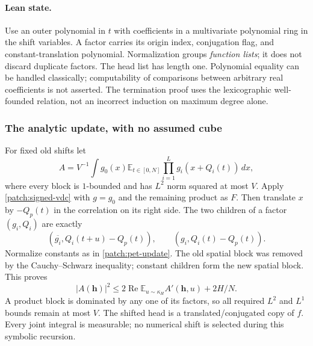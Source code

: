 \documentclass[11pt]{article}
\theoremstyle{definition}
\begin{document}
\paragraph{Lean state.}
Use an outer polynomial in $t$ with coefficients in a multivariate polynomial ring in the
shift variables.  A factor carries its origin index, conjugation flag, and constant-translation
polynomial.  Normalization groups \emph{function lists}; it does not discard duplicate factors.
The head list has length one.  Polynomial equality can be handled classically; computability
of comparisons between arbitrary real coefficients is not asserted.  The termination proof
uses the lexicographic well-founded relation, not an incorrect induction on maximum degree alone.

\subsubsection{The analytic update, with no assumed cube}
For fixed old shifts let
\[
 A=V^{-1}\int g_0(x)\mathbb E_{t\in[0,N]}
                   \prod_{i=1}^L g_i(x+Q_i(t))\,dx,
\]
where every block is $1$-bounded and has $L^2$ norm squared at most $V$.
Apply \cref{patch:signed-vdc} with $g=g_0$ and the remaining product as $F$.
Then translate $x$ by $-Q_p(t)$ in the correlation on its right side.
The two children of a factor $(g_i,Q_i)$ are exactly
\[
 (\overline{g_i},Q_i(t+u)-Q_p(t)),\qquad(g_i,Q_i(t)-Q_p(t)).
\]
Normalize constants as in \cref{patch:pet-update}.  The old spatial block was removed by the
Cauchy--Schwarz inequality; constant children form the new spatial block.  This proves
\begin{equation}\label{patch:pet-analytic-step}
 |A(\mathbf h)|^2\leq2\operatorname{Re}\mathbb E_{u\sim\kappa_H}
                       A'(\mathbf h,u)+2H/N.
\end{equation}
A product block is dominated by any one of its factors, so all required $L^2$ and $L^1$
bounds remain at most $V$.  The shifted head is a translated/conjugated copy of $f$.
Every joint integral is measurable; no numerical shift is selected during this symbolic recursion.
\end{document}
